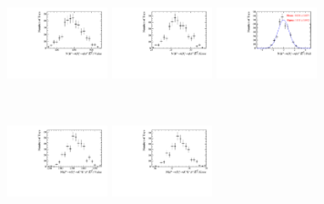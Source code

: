 \begin{figure}[!h]
   \centering
   \begin{subfigure}[t]{1.0\textwidth}
      \includegraphics[width=0.32\textwidth]{figs/B2DsPhi/Plots_DsKK_Value_yield_peak_DsD0_Ds2PhiPi_toy_both_DsBDTbin1_PhiBDTbin1_both_both.pdf}
      \includegraphics[width=0.32\textwidth]{figs/B2DsPhi/Plots_DsKK_Error_yield_peak_DsD0_Ds2PhiPi_toy_both_DsBDTbin1_PhiBDTbin1_both_both.pdf}
      \includegraphics[width=0.32\textwidth]{figs/B2DsPhi/Plots_DsKK_Pull_yield_peak_DsD0_Ds2PhiPi_toy_both_DsBDTbin1_PhiBDTbin1_both_both.pdf}
      \caption{\decay{\Dsp}{\phiz\pip}}
   \end{subfigure}\\
   \begin{subfigure}[t]{1.0\textwidth}
      \includegraphics[width=0.32\textwidth]{figs/B2DsPhi/Plots_DsKK_Value_yield_peak_DsD0_Ds2KKPi_toy_both_DsBDTbin1_PhiBDTbin1_both_both.pdf}
      \includegraphics[width=0.32\textwidth]{figs/B2DsPhi/Plots_DsKK_Error_yield_peak_DsD0_Ds2KKPi_toy_both_DsBDTbin1_PhiBDTbin1_both_both.pdf}

\end{subfigure}
\end{figure}
